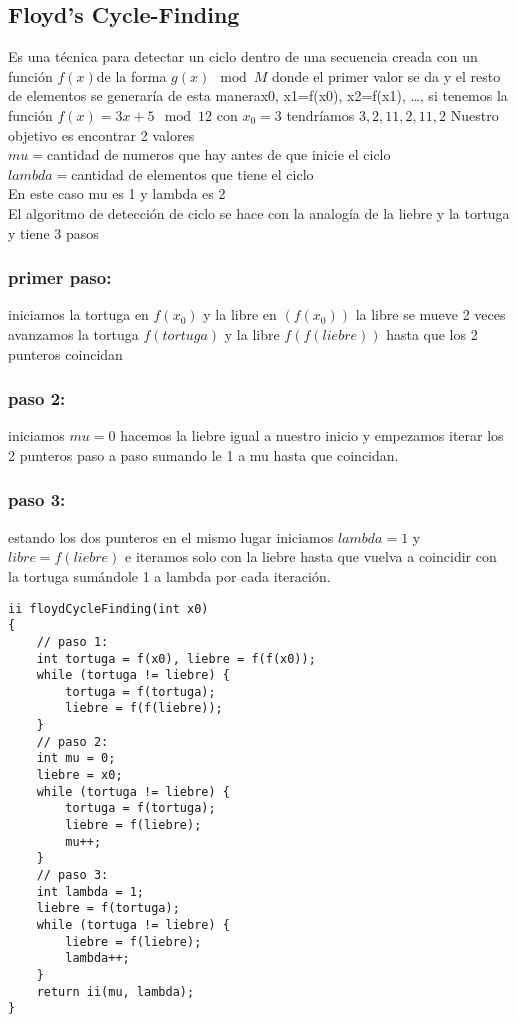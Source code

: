 \subsection{Floyd’s Cycle-Finding}
Es una técnica para detectar un ciclo dentro de una secuencia creada con un función $f(x)$de la forma $g(x) \mod{M}$
donde el primer valor se da y el resto de elementos  se generaría de esta manera{x0, x1=f(x0), x2=f(x1),  …},
si tenemos la función $f(x)=3x+5 \mod{12}$ con $x_0=3$ tendríamos ${3, 2,11,2,11,2}$ Nuestro objetivo es encontrar 2 valores
\\$mu = $cantidad de numeros que hay antes de que inicie el ciclo
\\$lambda = $cantidad de elementos que tiene el ciclo
\\En este caso mu es 1 y lambda es 2
\\El algoritmo de detección de ciclo se hace con la analogía de la liebre y la tortuga y tiene 3 pasos
\subsubsection{primer paso:}
iniciamos la  tortuga en $f(x_0)$ y la libre en $(f(x_0))$ la libre se mueve 2 veces avanzamos la tortuga $f(tortuga)$ y la libre $f(f(liebre))$ hasta que los 2 punteros coincidan
\subsubsection{paso 2:}
iniciamos $mu=0$ hacemos la liebre igual a nuestro inicio y empezamos iterar los 2 punteros paso a paso sumando le 1 a mu hasta que coincidan.
\subsubsection{paso 3:}
estando los dos punteros en el mismo lugar iniciamos $lambda=1$ y $libre=f(liebre)$
e iteramos solo con la liebre hasta que vuelva a coincidir con la tortuga sumándole 1 a lambda por cada iteración.
\begin{minipage}{\textwidth}
\begin{lstlisting}[style=C,caption=floydCycleFinding.cpp]
ii floydCycleFinding(int x0)
{
    // paso 1:
    int tortuga = f(x0), liebre = f(f(x0));
    while (tortuga != liebre) {
        tortuga = f(tortuga);
        liebre = f(f(liebre));
    }
    // paso 2:
    int mu = 0;
    liebre = x0;
    while (tortuga != liebre) {
        tortuga = f(tortuga);
        liebre = f(liebre);
        mu++;
    }
    // paso 3:
    int lambda = 1;
    liebre = f(tortuga);
    while (tortuga != liebre) {
        liebre = f(liebre);
        lambda++;
    }
    return ii(mu, lambda);
}
\end{lstlisting}
\end{minipage}
